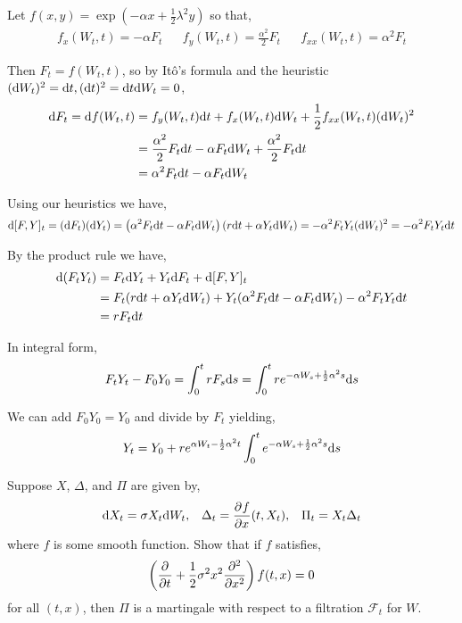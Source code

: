 \documentclass[10pt]{article}
\begin{document}
\begin{solution}[Solution]
Let \( f(x,y) = \exp(-\alpha x + \frac{1}{2} \lambda^2 y) \) so that,
\begin{align*}
    f_x(W_t,t) = -\alpha F_t && f_y(W_t,t) = \frac{\alpha^2}{2} F_t && f_{xx}(W_t,t) =  \alpha^2 F_t
\end{align*}

Then \( F_t = f(W_t,t) \), so by It\^o's formula and the heuristic \( (\d W_t)^2 =\d t, (\d t)^2 = \d t \d W_t = 0 \),
\begin{align*}
    \d F_t = \d f(W_t,t) &= f_y(W_t,t) \d t +  f_x(W_t,t) \d W_t + \frac{1}{2} f_{xx}(W_t,t) (\d W_t)^2 
    \\&= \frac{\alpha^2}{2}  F_t \d t -\alpha F_t \d W_t + \frac{\alpha^2}{2} F_t \d t
    \\&= \alpha^2 F_t \d t- \alpha F_t \d W_t
\end{align*}


Using our heuristics we have,
\begin{align*}
    \d[F,Y]_t = (\d F_t)(\d Y_t) = \left( \alpha^2 F_t \d t - \alpha F_t \d W_t \right) \left( r \d t + \alpha Y_t \d W_t \right)
    = -\alpha^2 F_tY_t (\d W_t)^2 
    = -\alpha^2 F_tY_t \d t
\end{align*}


By the product rule we have,
\begin{align*}
    \d (F_tY_t) &=  F_t \d Y_t + Y_t \d F_t + \d[F,Y]_t
    \\&= F_t (r\d t+\alpha Y_t \d W_t) + Y_t (\alpha^2 F_t \d t-\alpha F_t \d W_t) - \alpha^2 F_t Y_t \d t
    \\&= r F_t \d t 
\end{align*}

In integral form,
\begin{align*}
    F_t Y_t - F_0Y_0 = \int_{0}^{t}r F_s \d s = \int_{0}^{t} r e^{-\alpha W_s + \frac{1}{2} \alpha^2 s} \d s
\end{align*}

We can add \( F_0Y_0 = Y_0 \) and divide by \( F_t \) yielding,
\begin{align*}
    Y_t = Y_0 + r e^{\alpha W_t - \frac{1}{2}\alpha^2 t} \int_{0}^{t} e^{-\alpha W_s + \frac{1}{2} \alpha^2 s} \d s
\end{align*}
\end{solution}

\begin{problem}[Exercise 8.3]
Suppose \( X \), \( \Delta \), and \( \Pi \) are given by,
\begin{align*}
    \d X_t = \sigma X_t \d W_t, 
    && \Delta_t = \pp{f}{x} (t,X_t),
    && \Pi_t = X_t \Delta_t
\end{align*}
where \( f \) is some smooth function. Show that if \( f \) satisfies,
\begin{align*}
    \left( \pp{}{t} + \dfrac{1}{2}\sigma^2x^2 \pp[2]{}{x} \right) f(t,x) = 0
\end{align*}
    for all \( (t,x) \), then \( \Pi \) is a martingale with respect to a filtration \( \mathcal{F}_t \) for \( W \).
\end{problem}
\end{document}
